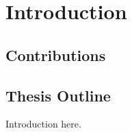 
\chapter{\label{chap:introduction}Introduction}

\section{Contributions}

\section{Thesis Outline}

Introduction here.\autocite{SustrikZeroMQ}